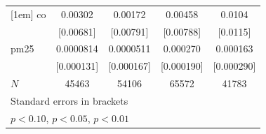 \documentclass[11pt]{article}
\begin{document}
\begin{subappendices}
\begin{center}
{{\begin{tabular}{l*{4}{c}}
						[1em]
						co          &     0.00302         &     0.00172         &     0.00458         &      0.0104         \\
						&   [0.00681]         &   [0.00791]         &   [0.00788]         &    [0.0115]         \\
						[1em]
						pm25        &   0.0000814         &   0.0000511         &    0.000270         &    0.000163         \\
						&  [0.000131]         &  [0.000167]         &  [0.000190]         &  [0.000290]         \\
						\hline
						\(N\)       &       45463         &       54106         &       65572         &       41783         \\
						\hline\hline
						\multicolumn{5}{l}{\footnotesize Standard errors in brackets}\\
						\multicolumn{5}{l}{\footnotesize \sym{*} \(p<0.10\), \sym{**} \(p<0.05\), \sym{***} \(p<0.01\)}\\
					\end{tabular}
				}
				
			}
		\end{center}
		

\end{subappendices}
\end{document}
